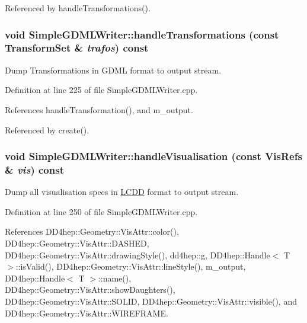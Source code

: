 Referenced by handleTransformations().\hypertarget{class_d_d4hep_1_1_geometry_1_1_simple_g_d_m_l_writer_aa29f0cbfbea29acd276be5ac39617d53}{
\subsubsection[{handleTransformations}]{\setlength{\rightskip}{0pt plus 5cm}void SimpleGDMLWriter::handleTransformations (const {\bf TransformSet} \& {\em trafos}) const}}
\label{class_d_d4hep_1_1_geometry_1_1_simple_g_d_m_l_writer_aa29f0cbfbea29acd276be5ac39617d53}


Dump Transformations in GDML format to output stream. 

Definition at line 225 of file SimpleGDMLWriter.cpp.

References handleTransformation(), and m\_\-output.

Referenced by create().\hypertarget{class_d_d4hep_1_1_geometry_1_1_simple_g_d_m_l_writer_a05103edd07021ff17363f0b26bdc4a84}{
\subsubsection[{handleVisualisation}]{\setlength{\rightskip}{0pt plus 5cm}void SimpleGDMLWriter::handleVisualisation (const {\bf VisRefs} \& {\em vis}) const}}
\label{class_d_d4hep_1_1_geometry_1_1_simple_g_d_m_l_writer_a05103edd07021ff17363f0b26bdc4a84}


Dump all visualisation specs in \hyperlink{class_d_d4hep_1_1_geometry_1_1_l_c_d_d}{LCDD} format to output stream. 

Definition at line 250 of file SimpleGDMLWriter.cpp.

References DD4hep::Geometry::VisAttr::color(), DD4hep::Geometry::VisAttr::DASHED, DD4hep::Geometry::VisAttr::drawingStyle(), dd4hep::g, DD4hep::Handle$<$ T $>$::isValid(), DD4hep::Geometry::VisAttr::lineStyle(), m\_\-output, DD4hep::Handle$<$ T $>$::name(), DD4hep::Geometry::VisAttr::showDaughters(), DD4hep::Geometry::VisAttr::SOLID, DD4hep::Geometry::VisAttr::visible(), and DD4hep::Geometry::VisAttr::WIREFRAME.

